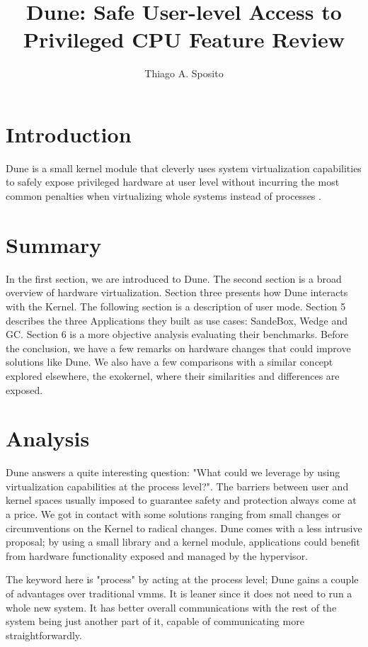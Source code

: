 \documentclass[12pt]{article}
\title{Dune: Safe User-level Access to Privileged CPU Feature Review}
\author{Thiago A. Sposito\inst{1} }
\begin{document}
 

\maketitle


\section{Introduction}
Dune is a small kernel module that cleverly uses system virtualization capabilities to safely expose privileged hardware at user level without incurring the most common penalties when virtualizing whole systems instead of processes \cite{belay2012dune}. 

\section{Summary}
In the first section, we are introduced to Dune. The second section is a broad overview of hardware virtualization. Section three presents how Dune interacts with the Kernel. The following section is a description of user mode. Section 5 describes the three Applications they built as use cases: SandeBox, Wedge and GC. Section 6 is a more objective analysis evaluating their benchmarks. Before the conclusion, we have a few remarks on hardware changes that could improve solutions like Dune. We also have a few comparisons with a similar concept explored elsewhere, the exokernel, where their similarities and differences are exposed.
\section{Analysis}
Dune answers a quite interesting question: "What could we leverage by using virtualization capabilities at the process level?". The barriers between user and kernel spaces usually imposed to guarantee safety and protection always come at a price. We got in contact with some solutions ranging from small changes or circumventions on the Kernel to radical changes. Dune comes with a less intrusive proposal; by using a small library and a kernel module, applications could benefit from hardware functionality exposed and managed by the hypervisor.

The keyword here is "process" by acting at the process level; Dune gains a couple of advantages over traditional vmms. It is leaner since it does not need to run a whole new system. It has better overall communications with the rest of the system being just another part of it, capable of communicating more straightforwardly.
\end{document}
